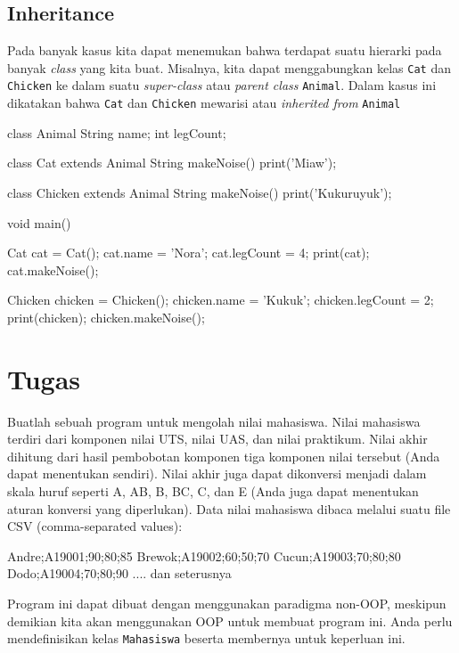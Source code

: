 \documentclass[a4paper,11pt]{article} %
\newcommand{\txtinline}[1]{\texttt{#1}}
\begin{document}



\subsection{Inheritance}

Pada banyak kasus kita dapat menemukan bahwa terdapat suatu hierarki pada banyak
\textit{class} yang kita buat. Misalnya, kita dapat menggabungkan kelas
\txtinline{Cat} dan \txtinline{Chicken} ke dalam suatu \textit{super-class}
atau \textit{parent class} \txtinline{Animal}.
Dalam kasus ini dikatakan bahwa \txtinline{Cat} dan \txtinline{Chicken} mewarisi
atau \textit{inherited from} \txtinline{Animal}

\begin{dartcode}
class Animal {
  String name;
  int legCount;
}
  
class Cat extends Animal {
  String makeNoise() {
    print('Miaw');
  }
}
  
class Chicken extends Animal {
  String makeNoise() {
    print('Kukuruyuk');
  }
}
  
void main() {
  Cat cat = Cat();
  cat.name = 'Nora';
  cat.legCount = 4;
  print(cat);
  cat.makeNoise();
  
  Chicken chicken = Chicken();
  chicken.name = 'Kukuk';
  chicken.legCount = 2;
  print(chicken);
  chicken.makeNoise();
}
\end{dartcode}

\section{Tugas}

Buatlah sebuah program untuk mengolah nilai mahasiswa. Nilai mahasiswa terdiri
dari komponen nilai UTS, nilai UAS, dan nilai praktikum. Nilai akhir dihitung dari
hasil pembobotan komponen tiga komponen nilai tersebut (Anda dapat menentukan
sendiri). Nilai akhir juga dapat dikonversi menjadi dalam skala huruf seperti
A, AB, B, BC, C, dan E (Anda juga dapat menentukan aturan konversi yang diperlukan).
Data nilai mahasiswa dibaca melalui suatu file CSV (comma-separated values):

\begin{textcode}
Andre;A19001;90;80;85
Brewok;A19002;60;50;70
Cucun;A19003;70;80;80
Dodo;A19004;70;80;90
.... dan seterusnya
\end{textcode}

Program ini dapat dibuat dengan menggunakan paradigma non-OOP, meskipun demikian
kita akan menggunakan OOP untuk membuat program ini.
Anda perlu mendefinisikan kelas \txtinline{Mahasiswa} beserta membernya untuk
keperluan ini.




\end{document}
